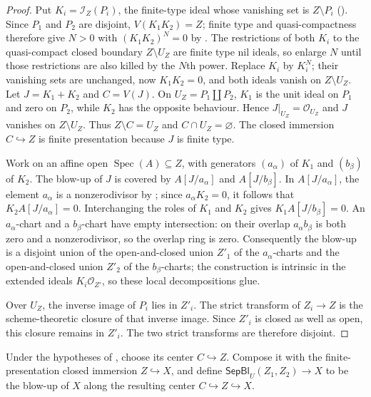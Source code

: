 \begin{proof}
  Put $K_i=\mathcal I_Z(P_i)$, the finite-type ideal whose vanishing set is
  $Z\setminus P_i$ ().  Since
  $P_1$ and $P_2$ are disjoint, $V(K_1K_2)=Z$; finite type and
  quasi-compactness therefore give $N>0$ with $(K_1K_2)^N=0$ by
  .  The restrictions of
  both $K_i$ to the quasi-compact closed boundary $Z\setminus U_Z$ are finite
  type nil ideals, so enlarge $N$ until those restrictions are also killed by
  the $N$th power.  Replace $K_i$ by $K_i^N$; their vanishing sets are
  unchanged, now $K_1K_2=0$, and both ideals vanish on $Z\setminus U_Z$.  Let
  $J=K_1+K_2$ and $C=V(J)$.  On $U_Z=P_1\amalg P_2$, $K_1$ is the unit ideal
  on $P_1$ and zero on $P_2$, while $K_2$ has the opposite behaviour.  Hence
  $J|_{U_Z}=\mathcal O_{U_Z}$ and $J$ vanishes on $Z\setminus U_Z$.  Thus
  $Z\setminus C=U_Z$ and $C\cap U_Z=\varnothing$.  The closed
  immersion $C\hookrightarrow Z$ is finite presentation because $J$ is finite
  type.

  Work on an affine open $\operatorname{Spec}(A)\subseteq Z$, with generators
  $(a_\alpha)$ of $K_1$ and $(b_\beta)$ of $K_2$.  The blow-up of $J$ is
  covered by $A[J/a_\alpha]$ and $A[J/b_\beta]$.  In
  $A[J/a_\alpha]$, the element $a_\alpha$ is a nonzerodivisor by
  ; since
  $a_\alpha K_2=0$, it follows that $K_2A[J/a_\alpha]=0$.  Interchanging
  the roles of $K_1$ and $K_2$ gives $K_1A[J/b_\beta]=0$.  An
  $a_\alpha$-chart and a $b_\beta$-chart have empty
  intersection: on their overlap $a_\alpha b_\beta$ is both zero and a
  nonzerodivisor, so the overlap ring is zero.  Consequently the blow-up is a
  disjoint union of the open-and-closed union $Z'_1$ of the $a_\alpha$-charts
  and the open-and-closed union $Z'_2$ of the $b_\beta$-charts; the construction
  is intrinsic in the extended ideals $K_i\mathcal O_{Z'}$, so these local
  decompositions glue.

  Over $U_Z$, the inverse image of $P_i$ lies in $Z'_i$.  The strict transform
  of $Z_i\to Z$ is the scheme-theoretic closure of that inverse image.  Since
  $Z'_i$ is closed as well as open, this closure remains in $Z'_i$.  The two
  strict transforms are therefore disjoint.
\end{proof}

\begin{definition}
  \label{def:nagata-separate-closed-subschemes}

  Under the hypotheses of
  , choose its center
  $C\hookrightarrow Z$.  Compose it with the finite-presentation closed
  immersion $Z\hookrightarrow X$, and define
  $\mathsf{SepBl}_U(Z_1,Z_2)\to X$ to be the blow-up of $X$ along the
  resulting center $C\hookrightarrow Z\hookrightarrow X$.
\end{definition}

